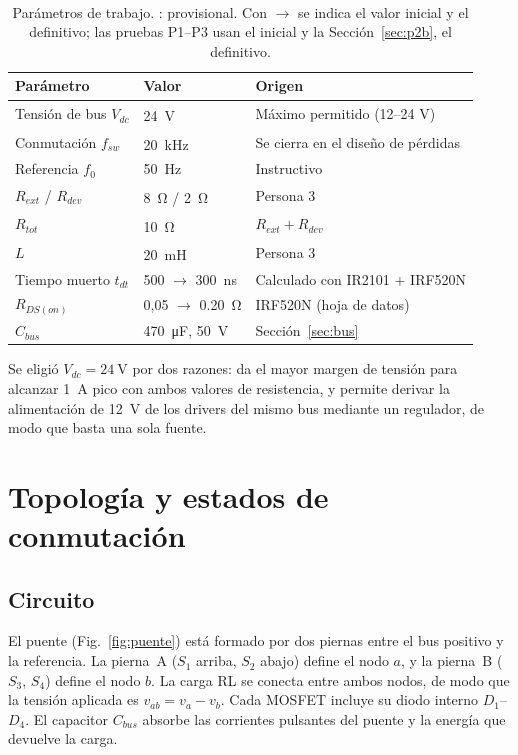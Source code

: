 \documentclass[10pt,twocolumn,letterpaper]{article}
\newcommand{\prov}{\textsuperscript{\textdagger}}
\begin{document}
\begin{table}[!t]
\centering
\caption{Parámetros de trabajo. \prov: provisional. Con $\to$ se indica el valor inicial y el definitivo; las pruebas P1--P3 usan el inicial y la Sección~\ref{sec:p2b}, el definitivo.}
\label{tab:param}
\footnotesize
\begin{tabular}{@{}l l >{\raggedright\arraybackslash}p{3.0cm}@{}}
\toprule
Parámetro & Valor & Origen \\
\midrule
Tensión de bus $V_{dc}$ & \SI{24}{\volt}\prov & Máximo permitido (12--24 V) \\
Conmutación $f_{sw}$ & \SI{20}{\kilo\hertz}\prov & Se cierra en el diseño de pérdidas \\
Referencia $f_0$ & \SI{50}{\hertz} & Instructivo \\
$R_{ext}$ / $R_{dev}$ & \SI{8}{\ohm} / \SI{2}{\ohm}\prov & Persona 3 \\
$R_{tot}$ & \SI{10}{\ohm}\prov & $R_{ext}+R_{dev}$ \\
$L$ & \SI{20}{\milli\henry}\prov & Persona 3 \\
Tiempo muerto $t_{dt}$ & 500 $\to$ \SI{300}{\nano\second} & Calculado con IR2101 + IRF520N \\
$R_{DS(on)}$ & 0,05 $\to$ \SI{0,20}{\ohm} & IRF520N (hoja de datos) \\
$C_{bus}$ & \SI{470}{\micro\farad}, \SI{50}{\volt} & Sección~\ref{sec:bus} \\
\bottomrule
\end{tabular}
\end{table}

Se eligió $V_{dc}=\SI{24}{\volt}$ por dos razones: da el mayor margen de tensión para alcanzar \SI{1}{\ampere} pico con ambos valores de resistencia, y permite derivar la alimentación de \SI{12}{\volt} de los drivers del mismo bus mediante un regulador, de modo que basta una sola fuente.

\section{Topología y estados de conmutación}
\subsection{Circuito}
El puente (Fig.~\ref{fig:puente}) está formado por dos piernas entre el bus positivo y la referencia. La pierna~A ($S_1$ arriba, $S_2$ abajo) define el nodo $a$, y la pierna~B ($S_3$, $S_4$) define el nodo $b$. La carga RL se conecta entre ambos nodos, de modo que la tensión aplicada es $v_{ab}=v_a-v_b$. Cada MOSFET incluye su diodo interno $D_1$--$D_4$. El capacitor $C_{bus}$ absorbe las corrientes pulsantes del puente y la energía que devuelve la carga.
\end{document}
